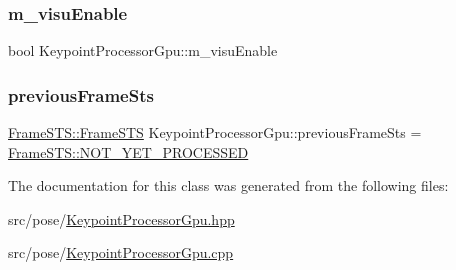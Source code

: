 \subsubsection{\texorpdfstring{m\+\_\+visu\+Enable}{m\_visuEnable}}
{\footnotesize\ttfamily bool Keypoint\+Processor\+Gpu\+::m\+\_\+visu\+Enable\hspace{0.3cm}{\ttfamily [private]}}

\mbox{\label{classKeypointProcessorGpu_a298b81730df9cce6b59b0fc35ba1c865}} 
\subsubsection{\texorpdfstring{previous\+Frame\+Sts}{previousFrameSts}}
{\footnotesize\ttfamily \hyperlink{namespaceFrameSTS_aa00e1583f3bc837ad3fbfb9beaaa0692}{Frame\+S\+T\+S\+::\+Frame\+S\+TS} Keypoint\+Processor\+Gpu\+::previous\+Frame\+Sts = \hyperlink{namespaceFrameSTS_aa00e1583f3bc837ad3fbfb9beaaa0692a8320d47ecf7adbfb6dedd682bf1820db}{Frame\+S\+T\+S\+::\+N\+O\+T\+\_\+\+Y\+E\+T\+\_\+\+P\+R\+O\+C\+E\+S\+S\+ED}\hspace{0.3cm}{\ttfamily [private]}}



The documentation for this class was generated from the following files\+:\begin{DoxyCompactItemize}
\item 
src/pose/\hyperlink{KeypointProcessorGpu_8hpp}{Keypoint\+Processor\+Gpu.\+hpp}\item 
src/pose/\hyperlink{KeypointProcessorGpu_8cpp}{Keypoint\+Processor\+Gpu.\+cpp}\end{DoxyCompactItemize}
